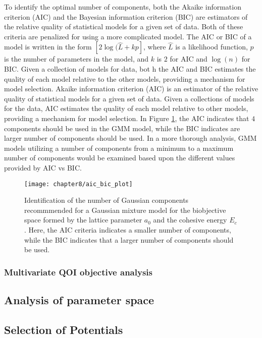 To identify the optimal number of components, both the Akaike information criterion (AIC)\cite{akaike1998_aic} and the Bayesian information criterion (BIC) \cite{schwarz1978_bic} are estimators of the relative quality of statistical models for a given set of data. Both of these criteria are penalized for using a more complicated model.  The AIC or BIC of a model is written in the form $[2\log(\hat{L}+kp]$, where $\hat{L}$ is a likelihood function, $p$ is the number of parameters in the model, and $k$ is $2$ for AIC and $\log(n)$ for BIC. Given a collection of models for data, bot h the AIC and BIC estimates the quality of each model relative to the other models, providing a mechanism for model selection.  Akaike information criterion (AIC) \cite{akaike1998_aic} is an estimator of the relative quality of statistical models for a given set of data.   Given a collections of models for the data, AIC estimates the quality of each model relative to other models, providing a mechanism for model selection.    In Figure \ref{fig:Si_Ec_a0_aic_bic}, the AIC indicates that $4$ components should be used in the GMM model, while the BIC indicates are larger number of components should be used.  In a more thorough analysis, GMM models utilizing a number of components from a minimum to a maximum number of components would be examined based upon the different values provided by AIC vs BIC.

\begin{figure}[ht]
	\centering
	\captionsetup{justification=centering,margin=1in}
	\texttt{[image: chapter8/aic\_bic\_plot]}
	\caption{Identification of the number of Gaussian components recommmended for a Gaussian mixture model for the biobjective space formed by the lattice parameter $a_0$ and the cohesive energy $E_c$.  Here, the AIC criteria indicates a smaller number of components, while the BIC indicates that a larger number of components should be used.}
	\label{fig:Si_Ec_a0_aic_bic}
\end{figure}



\subsubsection{Multivariate QOI objective analysis}

\subsection{Analysis of parameter space}
\subsection{Selection of Potentials}







